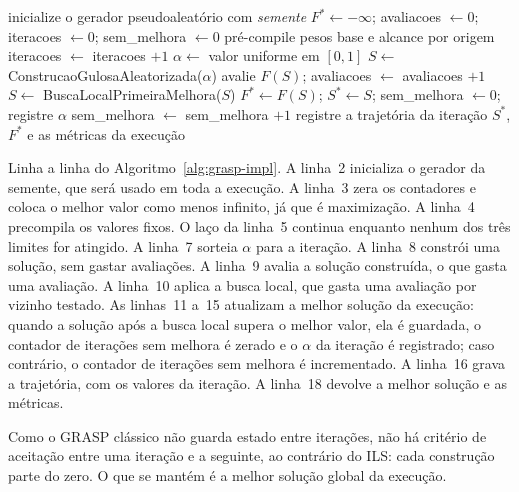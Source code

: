 \documentclass[11pt,a4paper]{article}
\begin{document}
\begin{algorithm}[t]
\caption{GRASP implementado, por semente (maximização de $\overline{\mathrm{IQC}}$)}
\label{alg:grasp-impl}
\begin{algorithmic}[1]
  \State inicialize o gerador pseudoaleatório com \emph{semente}
  \State $F^\ast \gets -\infty$; \quad avaliacoes $\gets 0$; \quad iteracoes $\gets 0$; \quad sem\_melhora $\gets 0$
  \State pré-compile pesos base e alcance por origem 
    \State iteracoes $\gets$ iteracoes $+ 1$
    \State $\alpha \gets$ valor uniforme em $[0,1]$
    \State $S \gets$ ConstrucaoGulosaAleatorizada($\alpha$) 
    \State avalie $F(S)$; \quad avaliacoes $\gets$ avaliacoes $+ 1$
    \State $S \gets$ BuscaLocalPrimeiraMelhora($S$) 
      \State $F^\ast \gets F(S)$; \quad $S^\ast \gets S$; \quad sem\_melhora $\gets 0$; \quad registre $\alpha$
    \Else
      \State sem\_melhora $\gets$ sem\_melhora $+ 1$
    \EndIf
    \State registre a trajetória da iteração
  \EndWhile
  \State \Return $S^\ast$, $F^\ast$ e as métricas da execução
\EndProcedure
\end{algorithmic}
\end{algorithm}

Linha a linha do Algoritmo~\ref{alg:grasp-impl}. A linha~2 inicializa o gerador da semente, que será usado em toda a execução. A linha~3 zera os contadores e coloca o melhor valor como menos infinito, já que é maximização. A linha~4 precompila os valores fixos. O laço da linha~5 continua enquanto nenhum dos três limites for atingido. A linha~7 sorteia $\alpha$ para a iteração. A linha~8 constrói uma solução, sem gastar avaliações. A linha~9 avalia a solução construída, o que gasta uma avaliação. A linha~10 aplica a busca local, que gasta uma avaliação por vizinho testado. As linhas~11 a~15 atualizam a melhor solução da execução: quando a solução após a busca local supera o melhor valor, ela é guardada, o contador de iterações sem melhora é zerado e o $\alpha$ da iteração é registrado; caso contrário, o contador de iterações sem melhora é incrementado. A linha~16 grava a trajetória, com os valores da iteração. A linha~18 devolve a melhor solução e as métricas.

Como o GRASP clássico não guarda estado entre iterações, não há critério de aceitação entre uma iteração e a seguinte, ao contrário do ILS: cada construção parte do zero. O que se mantém é a melhor solução global da execução.
\end{document}
